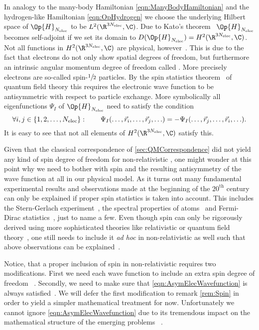 In analogy to the many-body Hamiltonian \eqref{eqn:ManyBodyHamiltonian}
and the hydrogen-like Hamiltonian \eqref{eqn:OpHydrogen}
we choose the underlying Hilbert space of $\Op{H}_{\Nelec}$
to be $L^2(\R^{3\Nelec}, \C)$.
Due to Kato's theorem~\cite{Kato1951} $\Op{H}_{\Nelec}$
becomes self-adjoint if we set its domain to $D(\Op{H}_{\Nelec}) = H^2(\R^{3\Nelec}, \C)$.
Not all functions in $H^2(\R^{3\Nelec}, \C)$ are physical, however~\cite{Mueller2000,Shankar1994}.
This is due to the fact that electrons do not only show spatial degrees of freedom,
but furthermore an intrinsic angular momentum degree of freedom
called .
More precisely electrons are so-called spin-$\sfrac12$ particles.
By the spin statistics theorem~\cite{Shankar1994} of quantum field theory
this requires the electronic wave function
to be antisymmetric with respect to particle exchange.
More symbolically all eigenfunctions $\Psi_I$ of $\Op{H}_{\Nelec}$
need to satisfy the condition
\begin{equation}
	\forall i,j \in \{1, 2, \ldots, N_\text{elec}\}: \qquad
	  \Psi_I(\ldots, \vec{r}_i, \ldots, \vec{r}_j, \ldots) =
	- \Psi_I(\ldots, \vec{r}_j, \ldots, \vec{r}_i, \ldots).
	\label{eqn:AsymElecWavefunction}
\end{equation}
It is easy to see that not all elements of $H^2(\R^{3\Nelec}, \C)$ satisfy this.

Given that the classical correspondence
of \vref{sec:QMCorrespondence} did not yield any kind of spin degree of freedom
for non-relativistic \QM,
one might wonder at this point
why we need to bother with spin and the resulting
antisymmetry of the wave function at all in our physical model.
As it turns out many fundamental experimental results
and observations made at the beginning of the $20^\text{th}$ century
can only be explained if proper spin statistics is taken into account.
This includes the Stern-Gerlach experiment~\cite{Gerlach1922b,Gerlach1922,Gerlach1922a},
the spectral properties of atoms~\cite{Pauli1925}
and Fermi-Dirac statistics~\cite{Dirac1926},
just to name a few.
Even though spin can only be rigorously derived
using more sophisticated theories like
relativistic \QM or quantum field theory~\cite{Shankar1994},
one still needs to include it \textit{ad hoc} in non-relativistic \QM as well
such that above observations can be explained~\cite{Pauli1925,Shankar1994,Straumann2004}.

Notice, that a proper inclusion of spin in non-relativistic \QM
requires two modifications.
First we need each wave function to include an extra spin degree of freedom%
~\cite{Pauli1925}.
Secondly, we need to make sure that \eqref{eqn:AsymElecWavefunction}
is always satisfied~\cite{Dirac1926}.
We will defer the first modification to remark \vref{rem:Spin}
in order to yield a simpler mathematical treatment for now.
Unfortunately we cannot ignore \eqref{eqn:AsymElecWavefunction}
due to its tremendous impact on the mathematical structure of the emerging problems%
~\cite{Dirac1926,Fock1930}.

